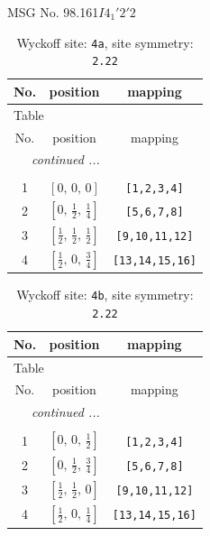 \documentclass[fleqn,8pt]{jsarticle}
\begin{document}
\setcounter{MaxMatrixCols}{32}

\renewcommand{\tablename}{Table~}
\renewcommand{\figurename}{Figure~}
\begin{center}
\LARGE
MSG No. 98.161\quad$I4_{1}'2'2$
\end{center}
\renewcommand{\arraystretch}{1.2}
\begin{longtable}{ccc}
\caption{Wyckoff site: {\tt 4a}, site symmetry: {\tt 2.22}}
 \\
 \hline \hline
No. & position & mapping \\ \hline \endfirsthead

\multicolumn{2}{l}{\tablename\ \thetable{}} \\
 \hline \hline
No. & position & mapping \\ \hline \endhead

 \hline \hline
\multicolumn{2}{r}{\footnotesize\it continued ...} \\ \endfoot

 \hline \hline
\multicolumn{2}{r}{} \\ \endlastfoot

1 & $\left[ 0,\, 0,\, 0 \right]$ & {\tt [1,2,3,4]} \\ \hline
2 & $\left[ 0,\, \frac{1}{2},\, \frac{1}{4} \right]$ & {\tt [5,6,7,8]} \\ \hline
3 & $\left[ \frac{1}{2},\, \frac{1}{2},\, \frac{1}{2} \right]$ & {\tt [9,10,11,12]} \\ \hline
4 & $\left[ \frac{1}{2},\, 0,\, \frac{3}{4} \right]$ & {\tt [13,14,15,16]} \\
\end{longtable}
\renewcommand{\arraystretch}{1.2}
\begin{longtable}{ccc}
\caption{Wyckoff site: {\tt 4b}, site symmetry: {\tt 2.22}}
 \\
 \hline \hline
No. & position & mapping \\ \hline \endfirsthead

\multicolumn{2}{l}{\tablename\ \thetable{}} \\
 \hline \hline
No. & position & mapping \\ \hline \endhead

 \hline \hline
\multicolumn{2}{r}{\footnotesize\it continued ...} \\ \endfoot

 \hline \hline
\multicolumn{2}{r}{} \\ \endlastfoot

1 & $\left[ 0,\, 0,\, \frac{1}{2} \right]$ & {\tt [1,2,3,4]} \\ \hline
2 & $\left[ 0,\, \frac{1}{2},\, \frac{3}{4} \right]$ & {\tt [5,6,7,8]} \\ \hline
3 & $\left[ \frac{1}{2},\, \frac{1}{2},\, 0 \right]$ & {\tt [9,10,11,12]} \\ \hline
4 & $\left[ \frac{1}{2},\, 0,\, \frac{1}{4} \right]$ & {\tt [13,14,15,16]} \\
\end{longtable}
\end{document}
